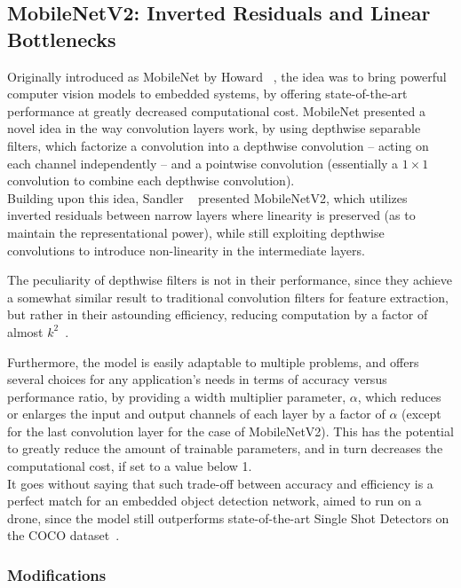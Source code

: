 \subsection{MobileNetV2: Inverted Residuals and Linear Bottlenecks}

Originally introduced as MobileNet by Howard \etal~\cite{MobileNet}, the idea
was to bring powerful computer vision models to embedded systems, by offering
state-of-the-art performance at greatly decreased computational cost. MobileNet
presented a novel idea in the way convolution layers work, by using depthwise
separable filters, which factorize a convolution into a depthwise convolution
-- acting on each channel independently -- and a pointwise convolution
(essentially a $1\times1$ convolution to combine each depthwise convolution).\\

Building upon this idea, Sandler \etal~\cite{MobileNetV2} presented
MobileNetV2, which utilizes inverted residuals between narrow layers where
linearity is preserved (as to maintain the representational power), while still
exploiting depthwise convolutions to introduce non-linearity in the
intermediate layers.

The peculiarity of depthwise filters is not in their performance, since they
achieve a somewhat similar result to traditional convolution filters for
feature extraction, but rather in their astounding efficiency, reducing
computation by a factor of almost $k^2$~\cite{MobileNetV2}.

Furthermore, the model is easily adaptable to multiple problems, and offers
several choices for any application's needs in terms of accuracy versus
performance ratio, by providing a width multiplier parameter, $\alpha$, which
reduces or enlarges the input and output channels of each layer by a factor of
$\alpha$ (except for the last convolution layer for the case of MobileNetV2).
This has the potential to greatly reduce the amount of trainable parameters,
and in turn decreases the computational cost, if set to a value below 1.\\

It goes without saying that such trade-off between accuracy and efficiency is a
perfect match for an embedded object detection network, aimed to run on a
drone, since the model still outperforms state-of-the-art Single Shot Detectors
on the COCO dataset~\cite{MobileNetV2}.\\

\subsubsection{Modifications}

